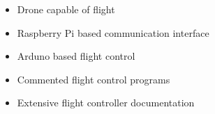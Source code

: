 \begin{itemize}
  \item Drone capable of flight	
  \item Raspberry Pi based communication interface
  \item Arduno based flight control
  \item Commented flight control programs
  \item Extensive flight controller documentation
\end{itemize}
